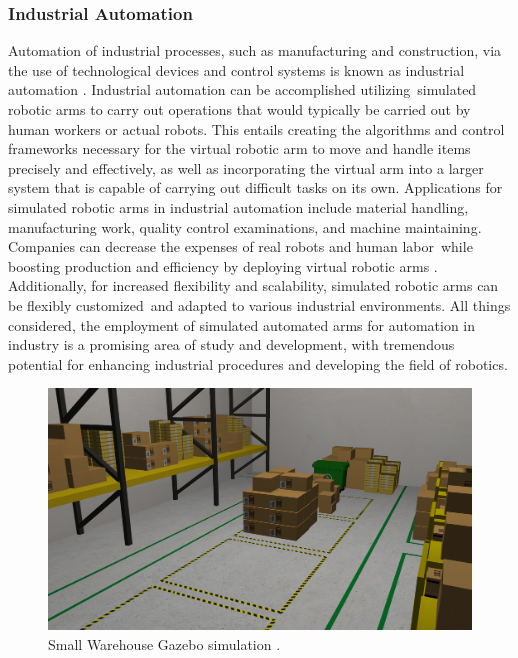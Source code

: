 \documentclass[12pt,oneside]{article}
\begin{document}
\subsubsection{Industrial Automation}
Automation of industrial processes, such as manufacturing and construction, via the use of technological devices and control systems is known as industrial automation \cite{7_leitao2016industrial}. Industrial automation can be accomplished utilizing simulated robotic arms to carry out operations that would typically be carried out by human workers or actual robots. This entails creating the algorithms and control frameworks necessary for the virtual robotic arm to move and handle items precisely and effectively, as well as incorporating the virtual arm into a larger system that is capable of carrying out difficult tasks on its own.
Applications for simulated robotic arms in industrial automation include material handling, manufacturing work, quality control examinations, and machine maintaining. Companies can decrease the expenses of real robots and human labor while boosting production and efficiency by deploying virtual robotic arms \cite{8_javaid2021substantial}. Additionally, for increased flexibility and scalability, simulated robotic arms can be flexibly customized and adapted to various industrial environments. All things considered, the employment of simulated automated arms for automation in industry is a promising area of study and development, with tremendous potential for enhancing industrial procedures and developing the field of robotics.

\begin{figure}[H]
\centering
\includegraphics[width=0.9\linewidth]{gazebo_city1}
\caption{Small Warehouse Gazebo simulation \cite{aws-robomaker-small-warehouse-world}.}
\label{fig:gazebocity1}
\end{figure}
\end{document}
